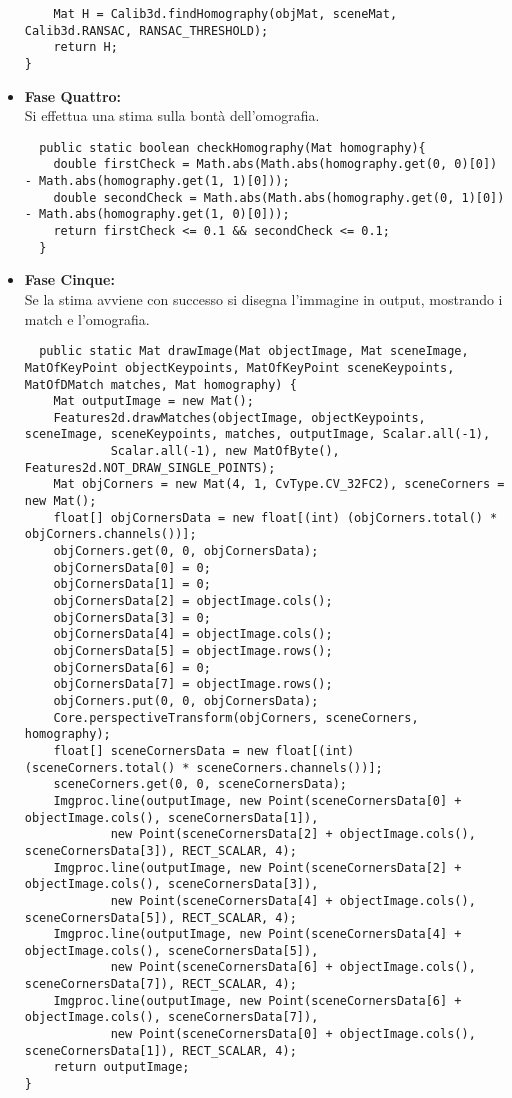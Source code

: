 \begin{itemize}
\begin{lstlisting}
    Mat H = Calib3d.findHomography(objMat, sceneMat, Calib3d.RANSAC, RANSAC_THRESHOLD);
    return H;
}
\end{lstlisting}
\item \textbf{Fase Quattro:}\\
Si effettua una stima sulla bontà dell'omografia.
\begin{lstlisting}
  public static boolean checkHomography(Mat homography){
    double firstCheck = Math.abs(Math.abs(homography.get(0, 0)[0]) - Math.abs(homography.get(1, 1)[0]));
    double secondCheck = Math.abs(Math.abs(homography.get(0, 1)[0]) - Math.abs(homography.get(1, 0)[0]));
    return firstCheck <= 0.1 && secondCheck <= 0.1;
  }
\end{lstlisting}
\item \textbf{Fase Cinque:}\\
Se la stima avviene con successo si disegna l'immagine in output, mostrando i match e l'omografia.
\begin{lstlisting}
  public static Mat drawImage(Mat objectImage, Mat sceneImage, MatOfKeyPoint objectKeypoints, MatOfKeyPoint sceneKeypoints, MatOfDMatch matches, Mat homography) {
    Mat outputImage = new Mat();
    Features2d.drawMatches(objectImage, objectKeypoints, sceneImage, sceneKeypoints, matches, outputImage, Scalar.all(-1),
            Scalar.all(-1), new MatOfByte(), Features2d.NOT_DRAW_SINGLE_POINTS);
    Mat objCorners = new Mat(4, 1, CvType.CV_32FC2), sceneCorners = new Mat();
    float[] objCornersData = new float[(int) (objCorners.total() * objCorners.channels())];
    objCorners.get(0, 0, objCornersData);
    objCornersData[0] = 0;
    objCornersData[1] = 0;
    objCornersData[2] = objectImage.cols();
    objCornersData[3] = 0;
    objCornersData[4] = objectImage.cols();
    objCornersData[5] = objectImage.rows();
    objCornersData[6] = 0;
    objCornersData[7] = objectImage.rows();
    objCorners.put(0, 0, objCornersData);
    Core.perspectiveTransform(objCorners, sceneCorners, homography);
    float[] sceneCornersData = new float[(int) (sceneCorners.total() * sceneCorners.channels())];
    sceneCorners.get(0, 0, sceneCornersData);
    Imgproc.line(outputImage, new Point(sceneCornersData[0] + objectImage.cols(), sceneCornersData[1]),
            new Point(sceneCornersData[2] + objectImage.cols(), sceneCornersData[3]), RECT_SCALAR, 4);
    Imgproc.line(outputImage, new Point(sceneCornersData[2] + objectImage.cols(), sceneCornersData[3]),
            new Point(sceneCornersData[4] + objectImage.cols(), sceneCornersData[5]), RECT_SCALAR, 4);
    Imgproc.line(outputImage, new Point(sceneCornersData[4] + objectImage.cols(), sceneCornersData[5]),
            new Point(sceneCornersData[6] + objectImage.cols(), sceneCornersData[7]), RECT_SCALAR, 4);
    Imgproc.line(outputImage, new Point(sceneCornersData[6] + objectImage.cols(), sceneCornersData[7]),
            new Point(sceneCornersData[0] + objectImage.cols(), sceneCornersData[1]), RECT_SCALAR, 4);
    return outputImage;
}
\end{lstlisting}


\end{itemize}
